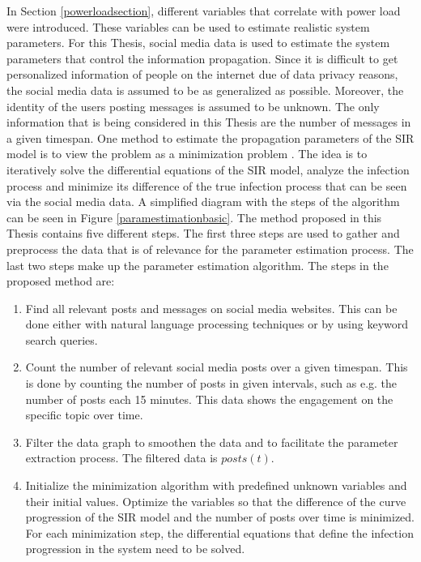 In Section \ref{powerloadsection}, different variables that 
correlate with power load were introduced. These variables can be 
used to estimate realistic system parameters. For this Thesis, social media data is 
used to estimate the system parameters that control the 
information propagation. Since it is difficult to get personalized 
information of people on the internet due of data privacy reasons, the
social media data is assumed to be as generalized as possible. Moreover, the identity 
of the users posting messages is assumed to be unknown. The only information
that is being considered in this Thesis are the number of messages in a given timespan.
One method to estimate the propagation parameters of the SIR model 
is to view the problem as a minimization problem 
\cite{jin2013epidemiological}. The idea is to iteratively solve the differential 
equations of the SIR model, analyze the infection process and minimize 
its difference of the true infection process that can be seen via the
social media data. A simplified diagram with the steps of the algorithm
can be seen in Figure \ref{paramestimationbasic}. The method proposed 
in this Thesis contains five different steps. 
The first three steps are used to gather and preprocess 
the data that is of relevance for the parameter estimation process.
The last two steps make up the parameter estimation algorithm.
The steps in the proposed method are:

\begin{enumerate}
    \item Find all relevant posts and messages on social media websites.
    This can be done either with natural language processing techniques or
    by using keyword search queries.
    \item Count the number of relevant social media posts over a given 
    timespan. This is done by counting the number of posts in given intervals, 
    such as e.g. the number of posts each 15 minutes. This data shows the
    engagement on the specific topic over time.
    \item Filter the data graph to smoothen the data and to facilitate the
    parameter extraction process. The filtered data is $posts(t)$.
    \item Initialize the minimization algorithm with predefined unknown
    variables and their initial values. Optimize the variables
    so that the difference of the curve progression of the SIR model
    and the number of posts over time is minimized. For each minimization
    step, the differential equations that define the infection progression
    in the system need to be solved.
\end{enumerate}

